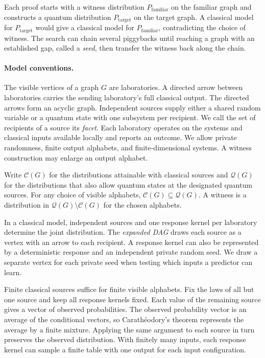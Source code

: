 \documentclass[11pt,a4paper]{article}
\newcommand{\Cset}{\mathcal C}
\newcommand{\Qset}{\mathcal Q}
\newcommand{\Ptarget}{P_{\text{target}}}
\newcommand{\Pfamiliar}{P_{\text{familiar}}}
\begin{document}
Each proof starts with a witness distribution \(\Pfamiliar\) on the familiar
graph and constructs a quantum distribution \(\Ptarget\) on the target graph.
A classical model for \(\Ptarget\) would give a classical model for
\(\Pfamiliar\), contradicting the choice of witness. The search can chain
several piggybacks until reaching a graph with an established gap, called a
\emph{seed}, then transfer the witness back along the chain.

\paragraph{Model conventions.}
The visible vertices of a graph \(G\) are laboratories. A directed arrow
between laboratories carries the sending laboratory's full classical output.
The directed arrows form an acyclic graph. Independent sources supply either
a shared random variable or a quantum state with one subsystem per recipient.
We call the set of recipients of a source its \emph{facet}. Each laboratory
operates on the systems and classical inputs available locally and reports an
outcome. We allow private randomness, finite output alphabets, and
finite-dimensional systems. A witness construction may enlarge an output
alphabet.

Write \(\Cset(G)\) for the distributions attainable with classical sources
and \(\Qset(G)\) for the distributions that also allow quantum states at
the designated quantum sources. For any choice of visible alphabets,
\(\Cset(G)\subseteq\Qset(G)\). A witness is a distribution in
\(\Qset(G)\setminus\Cset(G)\) for the chosen alphabets.

In a classical model, independent sources and one response kernel per
laboratory determine the joint distribution. The \emph{expanded DAG} draws
each source as a vertex with an arrow to each recipient. A response kernel
can also be represented by a deterministic response and an independent
private random seed. We draw a separate vertex for each private seed when
testing which inputs a predictor can learn.

Finite classical sources suffice for finite visible alphabets. Fix the laws
of all but one source and keep all response kernels fixed. Each value of the
remaining source gives a vector of observed probabilities. The observed
probability vector is an average of the conditional vectors, so
Carathéodory's theorem represents the average by a finite mixture. Applying
the same argument to each source in turn preserves the observed distribution.
With finitely many inputs, each response kernel can sample a finite table
with one output for each input configuration.
\end{document}
